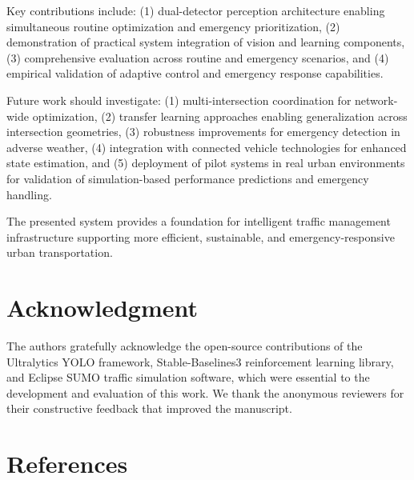 \documentclass[10pt,conference]{IEEEtran}
\begin{document}
Key contributions include: (1) dual-detector perception architecture enabling simultaneous routine optimization and emergency prioritization, (2) demonstration of practical system integration of vision and learning components, (3) comprehensive evaluation across routine and emergency scenarios, and (4) empirical validation of adaptive control and emergency response capabilities.

Future work should investigate: (1) multi-intersection coordination for network-wide optimization, (2) transfer learning approaches enabling generalization across intersection geometries, (3) robustness improvements for emergency detection in adverse weather, (4) integration with connected vehicle technologies for enhanced state estimation, and (5) deployment of pilot systems in real urban environments for validation of simulation-based performance predictions and emergency handling.

The presented system provides a foundation for intelligent traffic management infrastructure supporting more efficient, sustainable, and emergency-responsive urban transportation.

\section*{Acknowledgment}

The authors gratefully acknowledge the open-source contributions of the Ultralytics YOLO framework, Stable-Baselines3 reinforcement learning library, and Eclipse SUMO traffic simulation software, which were essential to the development and evaluation of this work. We thank the anonymous reviewers for their constructive feedback that improved the manuscript.

\section*{References}
\end{document}
